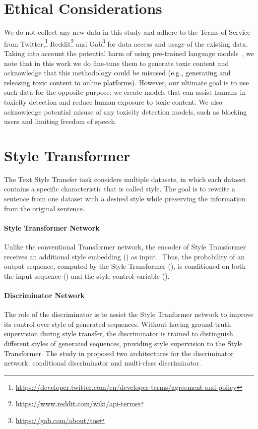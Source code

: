 \documentclass[acmsmall]{acmart}
\newcommand{\red}[1]{\textcolor{black}{#1}}
\begin{document}
\section*{Ethical Considerations}
We do not collect any new data in this study and adhere to the Terms of Service from Twitter,\footnote{\url{https://developer.twitter.com/en/developer-terms/agreement-and-policy}}  Reddit\footnote{\url{https://www.reddit.com/wiki/api-terms}} and Gab\footnote{\url{https://gab.com/about/tos}} for data access and usage of the existing data.
Taking into account the potential harm of using pre-trained language models~\cite{bender}, we note that in this work we do fine-tune them to generate toxic content and acknowledge that this methodology could be misused \red{(e.g., generating and releasing toxic content to online platforms)}. However, our ultimate goal is to use such data for the opposite purpose: we create models that can assist humans in toxicity detection and reduce human exposure to toxic content. We also acknowledge potential misuse of any toxicity detection models, such as blocking users and limiting freedom of speech.  




\appendix

\section{Style Transformer \label{app:styletrans}}
The Text Style Transfer task considers multiple datasets, in which each dataset contains a specific characteristic that is called style. The goal is to rewrite a sentence from one dataset with a desired style while preserving the information from the original sentence.

\paragraph{Style Transformer Network}
Unlike the conventional Transformer network, the encoder of Style Transformer receives an additional style embedding () as input \cite{style-transformer}. Thus, the probability of an output sequence, computed by the Style Transformer (), is conditioned on both the input sequence () and the style control variable ().


\paragraph{Discriminator Network} The role of the discriminator is to assist the Style Tranformer network to improve its control over style of generated sequences. Without having ground-truth supervision during style transfer, the discriminator is trained to distinguish different styles of generated sequences, providing style supervision to the Style Transformer. The study in \cite{style-transformer} proposed two architectures for the discriminator network: conditional discriminator and multi-class discriminator.
\end{document}
